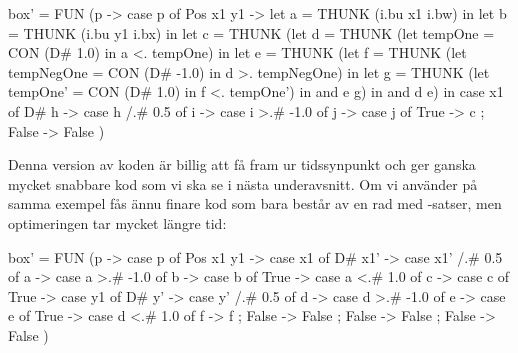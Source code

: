 \documentclass[Rapport]{subfiles}
\begin{document}
\begin{codeEx}
  box' = FUN (p -> case p of
     { Pos x1 y1 -> let
         { a = THUNK (i.bu x1 i.bw)
         } in let
           { b = THUNK (i.bu y1 i.bx)
           } in let
             { c = THUNK  (let
                 { d = THUNK (let
                     { tempOne = CON (D# 1.0)
                     } in a <. tempOne)
                 } in let
                   { e = THUNK (let
                       { f = THUNK (let
                           { tempNegOne = CON (D# -1.0)
                           } in d >. tempNegOne)
                       } in let
                         { g = THUNK (let
                             { tempOne' = CON (D# 1.0)
                             } in f <. tempOne')
                         } in and e g)
                   } in and d e)
             } in case x1 of
               { D# h -> case h /.# 0.5 of
                   { i -> case i >.# -1.0 of
                       { j -> case j of
                           { True  -> c
                           ; False  -> False
                           }
                       }
                   }
               }
     })
\end{codeEx}


Denna version av koden är billig att få fram ur tidssynpunkt och ger ganska
mycket snabbare kod som vi ska se i nästa underavsnitt. Om vi använder 
 på samma exempel fås ännu finare kod som bara består av en
rad med -satser, men optimeringen tar mycket längre tid:

\begin{codeEx}
box' = FUN (p -> case p of
   { Pos x1 y1 -> case x1 of
      { D# x1' -> case x1' /.# 0.5 of
         { a -> case a >.# -1.0 of
            { b -> case b of
               { True  -> case a <.# 1.0 of
                  { c -> case c of
                     { True  -> case y1 of
                        { D# y' -> case y' /.# 0.5 of
                           { d -> case d >.# -1.0 of
                              { e -> case e of
                                 { True  -> case d <.# 1.0 of
                                    { f -> f
                                    }
                                 ; False  -> False
                                 }
                              }
                           }
                        }
                     ; False  -> False
                     }
                  }
               ; False  -> False
               }
            }
         }
      }
   })
\end{codeEx}
\end{document}
